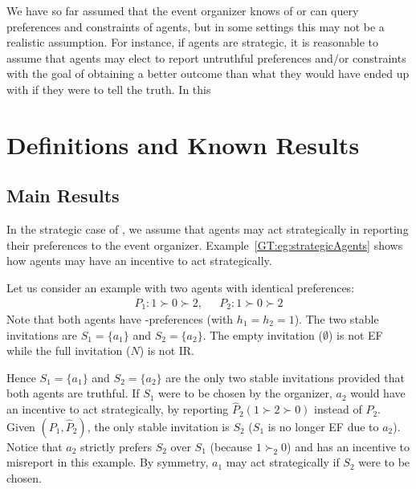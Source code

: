 \label{GT:chapter}


We have so far assumed that the event organizer knows of or can query preferences and constraints of agents, but in some settings this may not be a realistic assumption. For instance, if agents are strategic, it is reasonable to assume that agents may elect to report untruthful preferences and/or constraints with the goal of obtaining a better outcome than what they would have ended up with if they were to tell the truth. 
In this 

\section{Definitions and Known Results} \label{GT:sec:prelim}


\subsection{Main Results}\label{GT:sec:Mechanism}
In the strategic case of \ASIP, we assume that agents may act strategically in reporting their preferences to the event organizer. 
Example~\ref{GT:eg:strategicAgents} shows how agents may have an incentive to act strategically. 


\begin{example} \label{GT:eg:strategicAgents}
	
	Let us consider an example with two agents with identical preferences:
	\begin{equation*}
		\begin{aligned}
				P_1: 1 \succ 0 \succ 2,~~~& P_2: 1 \succ 0 \succ 2
		\end{aligned}
	\end{equation*}
	Note that both agents have \DEC-preferences (with $h_1 = h_2 = 1$).
	The two stable invitations are $S_1 = \{a_1\}$ and $S_2 = \{a_2\}$. 
	The empty invitation ($\emptyset$) is not EF while the full invitation ($N$) is not IR. 

	Hence $S_1 = \{a_1\}$ and $S_2 =\{a_2\}$ are the only two stable invitations provided that both agents are truthful. 
	If $S_1$ were to be chosen by the organizer, $a_2$ would have an incentive to act strategically, by reporting $\hat{P}_2 (1 \succ 2 \succ 0)$ instead of $P_2$. 
	Given $(P_1, \hat{P}_2)$, the only stable invitation is $S_2$ ($S_1$ is no longer EF due to $a_2$).
	Notice that $a_2$ strictly prefers $S_2$ over $S_1$ (because $1 \succ_2 0$) and has an incentive to misreport in this example. By symmetry, $a_1$ may act strategically if $S_2$ were to be chosen. 
\end{example}

